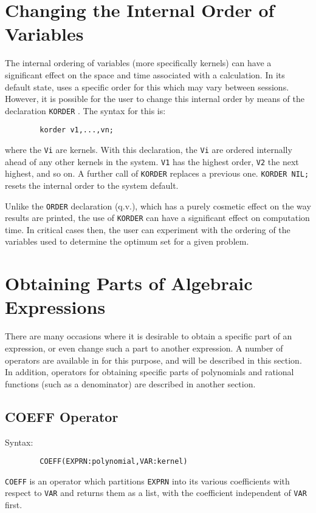 \section{Changing the Internal Order of Variables}

The internal ordering of variables (more specifically kernels) can have
a significant effect on the space and time associated with a calculation.
In its default state, {\REDUCE} uses a specific order for this which may
vary between sessions.  However, it is possible for the user to change
this internal order by means of the declaration
{\tt KORDER} .  The syntax for this is:
\begin{verbatim}
        korder v1,...,vn;
\end{verbatim}
where the {\tt Vi} are kernels.  With this declaration, the
{\tt Vi} are ordered internally ahead of any other kernels in the system.
{\tt V1} has the highest order, {\tt V2} the next highest, and so on.  A
further call of {\tt KORDER} replaces a previous one. {\tt KORDER NIL;}
resets the internal order to the system default.

Unlike the {\tt ORDER}  declaration (q.v.), which has a purely
cosmetic effect on the way results are printed, the use of {\tt KORDER}
can have a significant effect on computation time.  In critical cases
then, the user can experiment with the ordering of the variables used to
determine the optimum set for a given problem.

\section{Obtaining Parts of Algebraic Expressions}

There are many occasions where it is desirable to obtain a specific part
of an expression, or even change such a part to another expression. A
number of operators are available in {\REDUCE} for this purpose, and will be
described in this section. In addition, operators for obtaining specific
parts of polynomials and rational functions (such as a denominator) are
described in another section.

\subsection{COEFF Operator}
Syntax:
\begin{verbatim}
        COEFF(EXPRN:polynomial,VAR:kernel)
\end{verbatim}
{\tt COEFF} is an operator which partitions {\tt EXPRN} into its various
coefficients with respect to {\tt VAR} and returns them as a list, with
the coefficient independent of {\tt VAR} first.

